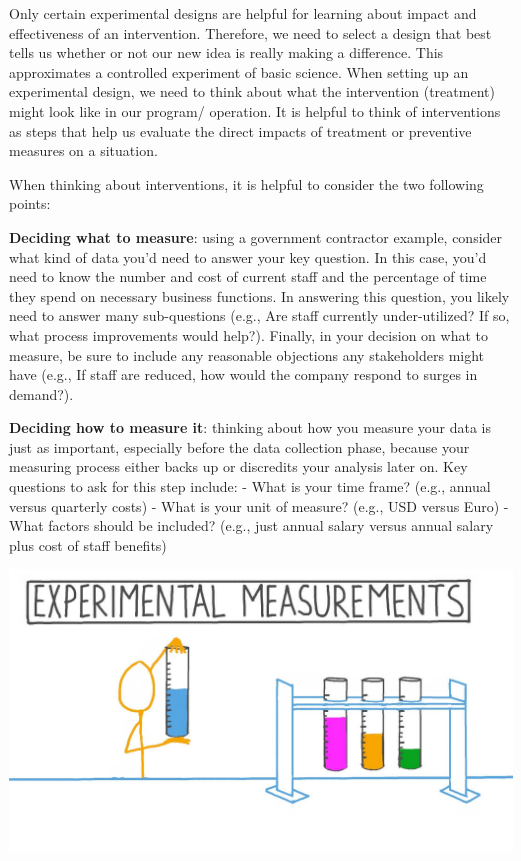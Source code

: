 \documentclass[]{book}
\begin{document}
Only certain experimental designs are helpful for learning about impact and effectiveness of an intervention. Therefore, we need to select a design that best tells us whether or not our new idea is really making a difference. This approximates a controlled experiment of basic science.
When setting up an experimental design, we need to think about what the intervention (treatment) might look like in our program/ operation. It is helpful to think of interventions as steps that help us evaluate the direct impacts of treatment or preventive measures on a situation.

When thinking about interventions, it is helpful to consider the two following points:

\textbf{Deciding what to measure}: using a government contractor example, consider what kind of data you'd need to answer your key question. In this case, you'd need to know the number and cost of current staff and the percentage of time they spend on necessary business functions. In answering this question, you likely need to answer many sub-questions (e.g., Are staff currently under-utilized? If so, what process improvements would help?). Finally, in your decision on what to measure, be sure to include any reasonable objections any stakeholders might have (e.g., If staff are reduced, how would the company respond to surges in demand?).

\textbf{Deciding how to measure it}: thinking about how you measure your data is just as important, especially before the data collection phase, because your measuring process either backs up or discredits your analysis later on. Key questions to ask for this step include:
- What is your time frame? (e.g., annual versus quarterly costs)
- What is your unit of measure? (e.g., USD versus Euro)
- What factors should be included? (e.g., just annual salary versus annual salary plus cost of staff benefits)

\includegraphics{fig/experimental_measurements.jpeg}
\end{document}
